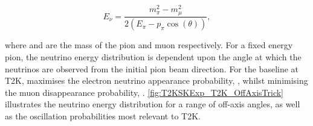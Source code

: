 \begin{equation}
  E_\nu = \frac{m^{2}_{\pi} - m^{2}_{\mu}}{2\left(E_\pi - p_\pi \cos(\theta) \right)},
\end{equation}

where  and  are the mass of the pion and muon respectively. For a fixed energy pion, the neutrino energy distribution is dependent upon the angle at which the neutrinos are observed from the initial pion beam direction. For the  baseline at T2K,  maximises the electron neutrino appearance probability, , whilst minimising the muon disappearance probability, . \autoref{fig:T2KSKExp_T2K_OffAxisTrick} illustrates the neutrino energy distribution for a range of off-axis angles, as well as the oscillation probabilities most relevant to T2K.

